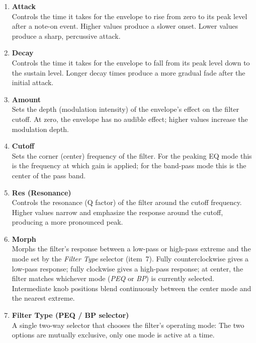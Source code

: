 \documentclass[11pt]{article}
\begin{document}
\begin{enumerate}[label=\textbf{\arabic*.}, leftmargin=2em]

\item \textbf{Attack} \\
Controls the time it takes for the envelope to rise from zero to its peak level after a note-on event. Higher values produce a slower onset. Lower values produce a sharp, percussive attack.

\item \textbf{Decay} \\
Controls the time it takes for the envelope to fall from its peak level down to the sustain level. Longer decay times produce a more gradual fade after the initial attack.


\item \textbf{Amount} \\
Sets the depth (modulation intensity) of the envelope's effect on the filter cutoff. At zero, the envelope has no audible effect; higher values increase the modulation depth.

\item \textbf{Cutoff} \\
Sets the corner (center) frequency of the filter. For the peaking EQ mode this is the frequency at which gain is applied; for the band-pass mode this is the center of the pass band.

\item \textbf{Res (Resonance)} \\
Controls the resonance (Q factor) of the filter around the cutoff frequency. Higher values narrow and emphasize the response around the cutoff, producing a more pronounced peak.

\item \textbf{Morph} \\
Morphs the filter's response between a low-pass or high-pass extreme and the mode set by the \textit{Filter Type} selector (item~7). Fully counterclockwise gives a low-pass response; fully clockwise gives a high-pass response; at center, the filter matches whichever mode (\textit{PEQ} or \textit{BP}) is currently selected. Intermediate knob positions blend continuously between the center mode and the nearest extreme.

\item \textbf{Filter Type (PEQ / BP selector)} \\
A single two-way selector that chooses the filter's operating mode: The two options are mutually exclusive, only one mode is active at a time.


\end{enumerate}
\end{document}
